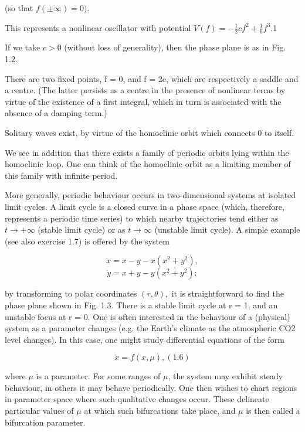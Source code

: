 \documentclass{article}
\begin{document}
(so that $f(\pm \infty) = 0)$. 

\hfill

This represents a nonlinear oscillator with potential $V( f ) = - \frac{1}{2} cf^2 + \frac{1}{6} 
f^3$.1 

\hfill

If we take $c > 0$ (without loss of generality), then the phase plane is
as in Fig. 1.2. 

\hfill

There are two fixed points, f = 0, and f = 2c, which are respectively
a saddle and a centre. (The latter persists as a centre in the presence of nonlinear
terms by virtue of the existence of a first integral, which in turn is associated with the
absence of a damping term.) 

\hfill

Solitary waves exist, by virtue of the homoclinic orbit
which connects 0 to itself. 

\hfill

We see in addition that there exists a family of periodic
orbits lying within the homoclinic loop. One can think of the homoclinic orbit as a
limiting member of this family with infinite period.

More generally, periodic behaviour occurs in two-dimensional systems at isolated
limit cycles. A limit cycle is a closed curve in a phase space (which, therefore,
represents a periodic time series) to which nearby trajectories tend either as $t \to + \infty$
(stable limit cycle) or as $t \to \infty$ (unstable limit cycle). A simple example (see also
exercise 1.7) is offered by the system

\[
\dot{x} = x - y - x(x^2 + y^2),
\]
\[
\dot{y} = x + y - y(x^2 + y^2); 
\]


by transforming to polar coordinates $(r, \theta),$ it is straightforward to find the phase
plane shown in Fig. 1.3. There is a stable limit cycle at r = 1, and an unstable focus
at r = 0.
One is often interested in the behaviour of a (physical) system as a parameter
changes (e.g. the Earth’s climate as the atmospheric CO2 level changes). In this case,
one might study differential equations of the form

\[
\dot{x} = f (x, \mu), (1.6)
\]

where $\mu$ is a parameter. For some ranges of $\mu$, the system may exhibit steady
behaviour, in others it may behave periodically. One then wishes to chart regions
in parameter space where such qualitative changes occur. These delineate particular
values of $\mu$ at which such bifurcations take place, and $\mu$ is then called a bifurcation
parameter.
\end{document}
